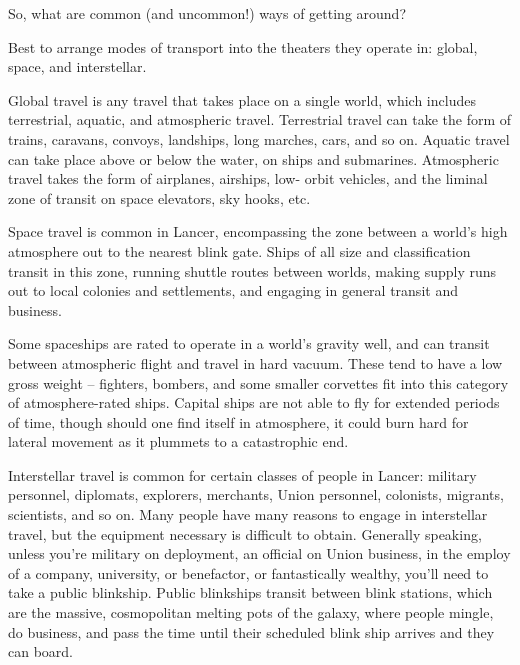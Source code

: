 So, what are common (and uncommon!) ways of getting around? 
 

Best to arrange modes of transport into the theaters they operate in: global, space, and  
interstellar. 
 

Global travel is any travel that takes place on a single world, which includes terrestrial, aquatic,  
and atmospheric travel. Terrestrial travel can take the form of trains, caravans, convoys,  
landships, long marches, cars, and so on. Aquatic travel can take place above or below the  
water, on ships and submarines. Atmospheric travel takes the form of airplanes, airships, low- 
orbit vehicles, and the liminal zone of transit on space elevators, sky hooks, etc. 
 

Space travel is common in Lancer, encompassing the zone between a world’s high atmosphere  
out to the nearest blink gate. Ships of all size and classification transit in this zone, running  
shuttle routes between worlds, making supply runs out to local colonies and settlements, and  
engaging in general transit and business. 
 

Some spaceships are rated to operate in a world’s gravity well, and can transit between  
atmospheric flight and travel in hard vacuum. These tend to have a low gross weight --  fighters,  
bombers, and some smaller corvettes fit into this category of atmosphere-rated ships. Capital  
ships are not able to fly for extended periods of time, though should one find itself in  
atmosphere, it could burn hard for lateral movement as it plummets to a catastrophic end.  
 

                                                                                                                  


Interstellar travel is common for certain classes of people in Lancer: military personnel,  
diplomats, explorers, merchants, Union personnel, colonists, migrants, scientists, and so on.  
Many people have many reasons to engage in interstellar travel, but the equipment necessary is  
difficult to obtain. Generally speaking, unless you’re military on deployment, an official on Union  
business, in the employ of a company, university, or benefactor, or fantastically wealthy, you’ll  
need to take a public blinkship. Public blinkships transit between blink stations, which are the  
massive, cosmopolitan melting pots of the galaxy, where people mingle, do business, and pass  
the time until their scheduled blink ship arrives and they can board.   
 

